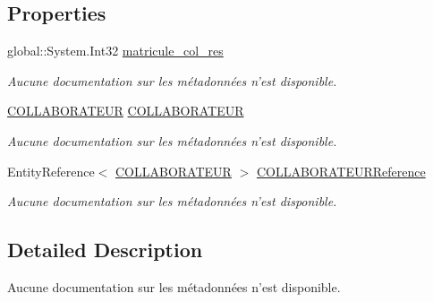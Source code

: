 \subsection*{Properties}
\begin{DoxyCompactItemize}
\item 
global\-::\-System.\-Int32 \hyperlink{class_model_1_1_r_e_s_p_o_n_s_a_b_l_e___d_e___s_e_c_t_e_u_r_af326e57ab9a6b071e90fdc7397891569}{matricule\-\_\-col\-\_\-res}
\begin{DoxyCompactList}\small\item\em Aucune documentation sur les métadonnées n'est disponible. \end{DoxyCompactList}\item 
\hyperlink{class_model_1_1_c_o_l_l_a_b_o_r_a_t_e_u_r}{C\-O\-L\-L\-A\-B\-O\-R\-A\-T\-E\-U\-R} \hyperlink{class_model_1_1_r_e_s_p_o_n_s_a_b_l_e___d_e___s_e_c_t_e_u_r_aff60e5a39706f59b8f1638b093db3063}{C\-O\-L\-L\-A\-B\-O\-R\-A\-T\-E\-U\-R}
\begin{DoxyCompactList}\small\item\em Aucune documentation sur les métadonnées n'est disponible. \end{DoxyCompactList}\item 
Entity\-Reference$<$ \hyperlink{class_model_1_1_c_o_l_l_a_b_o_r_a_t_e_u_r}{C\-O\-L\-L\-A\-B\-O\-R\-A\-T\-E\-U\-R} $>$ \hyperlink{class_model_1_1_r_e_s_p_o_n_s_a_b_l_e___d_e___s_e_c_t_e_u_r_ad59165995faa8ea9fbffe4748f438090}{C\-O\-L\-L\-A\-B\-O\-R\-A\-T\-E\-U\-R\-Reference}
\begin{DoxyCompactList}\small\item\em Aucune documentation sur les métadonnées n'est disponible. \end{DoxyCompactList}\end{DoxyCompactItemize}


\subsection{Detailed Description}
Aucune documentation sur les métadonnées n'est disponible. 



